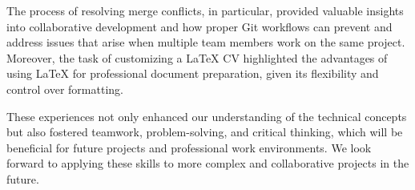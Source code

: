 \documentclass[a4paper,12pt]{article}
\begin{document}
The process of resolving merge conflicts, in particular, provided valuable insights into collaborative development and how proper Git workflows can prevent and address issues that arise when multiple team members work on the same project. Moreover, the task of customizing a LaTeX CV highlighted the advantages of using LaTeX for professional document preparation, given its flexibility and control over formatting.

These experiences not only enhanced our understanding of the technical concepts but also fostered teamwork, problem-solving, and critical thinking, which will be beneficial for future projects and professional work environments. We look forward to applying these skills to more complex and collaborative projects in the future.
\end{document}
